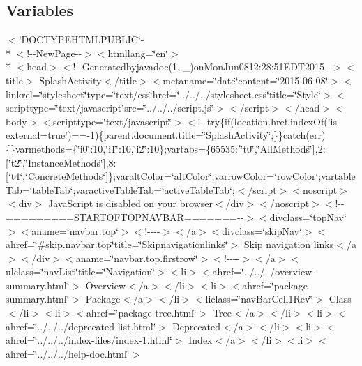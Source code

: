 \subsection*{Variables}
\begin{DoxyCompactItemize}
\item 
$<$!D\-O\-C\-T\-Y\-P\-E\-H\-T\-M\-L\-P\-U\-B\-L\-I\-C\char`\"{}-\/\\*
$<$!-\/-\/New\-Page-\/-\/$>$$<$htmllang=\char`\"{}en\char`\"{}$>$\\*
$<$head$>$$<$!-\/-\/Generatedbyjavadoc(1..\-\_)on\-Mon\-Jun0812\-:28\-:51\-E\-D\-T2015-\/-\/$>$$<$title$>$ Splash\-Activity$<$/title$>$$<$metaname=\char`\"{}date\char`\"{}content=\char`\"{}2015-\/06-\/08\char`\"{}$>$$<$linkrel=\char`\"{}stylesheet\char`\"{}type=\char`\"{}text/css\char`\"{}href=\char`\"{}../../../stylesheet.\-css\char`\"{}title=\char`\"{}\-Style\char`\"{}$>$$<$scripttype=\char`\"{}text/javascript\char`\"{}src=\char`\"{}../../../script.\-js\char`\"{}$>$$<$/script$>$$<$/head$>$$<$body$>$$<$scripttype=\char`\"{}text/javascript\char`\"{}$>$$<$!-\/-\/try\{if(location.\-href.\-index\-Of('is-\/external=true')==-\/1)\{parent.\-document.\-title=\char`\"{}\-Splash\-Activity\char`\"{};\}\}catch(err)\{\}varmethods=\{\char`\"{}i0\char`\"{}\-:10,\char`\"{}i1\char`\"{}\-:10,\char`\"{}i2\char`\"{}\-:10\};vartabs=\{65535\-:\mbox{[}\char`\"{}t0\char`\"{},\char`\"{}\-All\-Methods\char`\"{}\mbox{]},2\-:\mbox{[}\char`\"{}t2\char`\"{},\char`\"{}\-Instance\-Methods\char`\"{}\mbox{]},8\-:\mbox{[}\char`\"{}t4\char`\"{},\char`\"{}\-Concrete\-Methods\char`\"{}\mbox{]}\};varalt\-Color=\char`\"{}alt\-Color\char`\"{};varrow\-Color=\char`\"{}row\-Color\char`\"{};vartable\-Tab=\char`\"{}table\-Tab\char`\"{};varactive\-Table\-Tab=\char`\"{}active\-Table\-Tab\char`\"{};$<$/script$>$$<$noscript$>$$<$div$>$ Java\-Script is disabled on your browser$<$/div$>$$<$/noscript$>$$<$!-\/-\/=========\-S\-T\-A\-R\-T\-O\-F\-T\-O\-P\-N\-A\-V\-B\-A\-R=======-\/-\/$>$$<$divclass=\char`\"{}top\-Nav\char`\"{}$>$$<$aname=\char`\"{}navbar.\-top\char`\"{}$>$$<$!-\/-\/-\/-\/$>$$<$/a$>$$<$divclass=\char`\"{}skip\-Nav\char`\"{}$>$$<$ahref=\char`\"{}\#skip.\-navbar.\-top\char`\"{}title=\char`\"{}\-Skipnavigationlinks\char`\"{}$>$ Skip navigation links$<$/a$>$$<$/div$>$$<$aname=\char`\"{}navbar.\-top.\-firstrow\char`\"{}$>$$<$!-\/-\/-\/-\/$>$$<$/a$>$$<$ulclass=\char`\"{}nav\-List\char`\"{}title=\char`\"{}\-Navigation\char`\"{}$>$$<$li$>$$<$ahref=\char`\"{}../../../overview-\/summary.\-html\char`\"{}$>$ Overview$<$/a$>$$<$/li$>$$<$li$>$$<$ahref=\char`\"{}package-\/summary.\-html\char`\"{}$>$ Package$<$/a$>$$<$/li$>$$<$liclass=\char`\"{}nav\-Bar\-Cell1\-Rev\char`\"{}$>$ Class$<$/li$>$$<$li$>$$<$ahref=\char`\"{}package-\/tree.\-html\char`\"{}$>$ Tree$<$/a$>$$<$/li$>$$<$li$>$$<$ahref=\char`\"{}../../../deprecated-\/list.\-html\char`\"{}$>$ Deprecated$<$/a$>$$<$/li$>$$<$li$>$$<$ahref=\char`\"{}../../../index-\/files/index-\/1.\-html\char`\"{}$>$ Index$<$/a$>$$<$/li$>$$<$li$>$$<$ahref=\char`\"{}../../../help-\/doc.\-html\char`\"{}$>$ $$
\end{DoxyCompactItemize}
